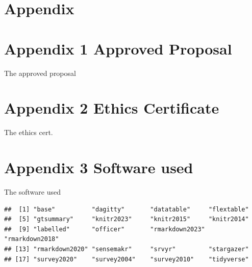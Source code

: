 \documentclass[
]{article}
\begin{document}
\hypertarget{appendix}{%
\section*{Appendix}\label{appendix}}

\hypertarget{appendix-1-approved-proposal}{%
\section{Appendix 1 Approved
Proposal}\label{appendix-1-approved-proposal}}

The approved proposal

\hypertarget{appendix-2-ethics-certificate}{%
\section{Appendix 2 Ethics
Certificate}\label{appendix-2-ethics-certificate}}

The ethics cert.

\hypertarget{appendix-3-software-used}{%
\section{Appendix 3 Software used}\label{appendix-3-software-used}}

The software used

\begin{verbatim}
##  [1] "base"          "dagitty"       "datatable"     "flextable"    
##  [5] "gtsummary"     "knitr2023"     "knitr2015"     "knitr2014"    
##  [9] "labelled"      "officer"       "rmarkdown2023" "rmarkdown2018"
## [13] "rmarkdown2020" "sensemakr"     "srvyr"         "stargazer"    
## [17] "survey2020"    "survey2004"    "survey2010"    "tidyverse"
\end{verbatim}
\end{document}
